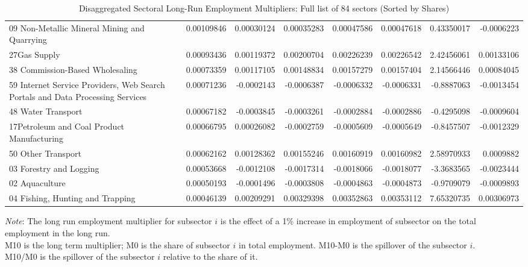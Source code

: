 \documentclass{monashthesis}
\begin{document}
\begin{table}[ht]
{\begin{tabular}{|l|r|rrrr|rr|}
    09 Non-Metallic Mineral Mining and Quarrying & 0.00109846 & 0.00030124 & 0.00035283 & 0.00047586 & 0.00047618 & 0.43350017 & -0.0006223 \\
    27Gas Supply & 0.00093436 & 0.00119372 & 0.00200704 & 0.00226239 & 0.00226542 & 2.42456061 & 0.00133106 \\
    38 Commission-Based Wholesaling & 0.00073359 & 0.00117105 & 0.00148834 & 0.00157279 & 0.00157404 & 2.14566446 & 0.00084045 \\
    59 Internet Service Providers, Web Search Portals and Data Processing Services & 0.00071236 & -0.0002143 & -0.0006387 & -0.0006332 & -0.0006331 & -0.8887063 & -0.0013454 \\
    48 Water Transport & 0.00067182 & -0.0003845 & -0.0003261 & -0.0002884 & -0.0002886 & -0.4295098 & -0.0009604 \\
    17Petroleum and Coal Product Manufacturing & 0.00066795 & 0.00026082 & -0.0002759 & -0.0005609 & -0.0005649 & -0.8457507 & -0.0012329 \\
    50 Other Transport & 0.00062162 & 0.00128362 & 0.00155246 & 0.00160919 & 0.00160982 & 2.58970933 & 0.0009882 \\
    03 Forestry and Logging & 0.00053668 & -0.0012108 & -0.0017314 & -0.0018066 & -0.0018077 & -3.3683565 & -0.0023444 \\
    02 Aquaculture & 0.00050193 & -0.0001496 & -0.0003808 & -0.0004863 & -0.0004873 & -0.9709079 & -0.0009893 \\
    04 Fishing, Hunting and Trapping & 0.00046139 & 0.00209291 & 0.00329398 & 0.00352863 & 0.00353112 & 7.65320735 & 0.00306973 \\
    \hline\hline 
    \end{tabular}} 
    \begin{tablenotes} 
      \footnotesize
      \item \emph{Note}: The long run employment multiplier for subsector $i$ is the effect of a 1\% increase in employment of subsector on the total employment in the long run. \\
      M10 is the long term multiplier; M0 is the share of subsector $i$ in total employment.
      M10-M0 is the spillover of the subsector $i$. \\
      M10/M0 is the spillover of the subsector $i$ relative to the share of it.
\end{tablenotes}
\caption{Disaggregated Sectoral Long-Run Employment Multipliers: Full list of 84 sectors (Sorted by Shares)}
  \label{dis:emp}
\end{table}

\printbibliography[heading=bibintoc]
\end{document}
